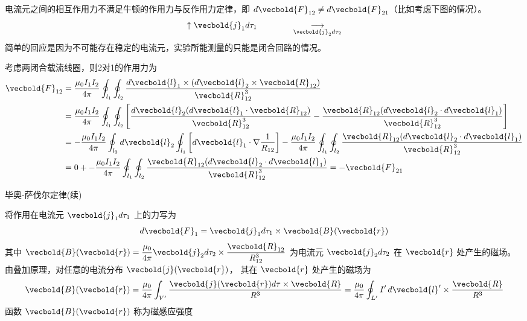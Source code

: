 \begin{example}
    电流元之间的相互作用力不满足牛顿的作用力与反作用力定律，即 \( d\vecbold{F}_{12} \neq d\vecbold{F}_{21} \)（比如考虑下图的情况）。
\[
\uparrow \vecbold{j}_1 d\tau_1
\qquad\qquad
\underset{\vecbold{j}_2 d\tau_2}{\longrightarrow}
\]
简单的回应是因为不可能存在稳定的电流元，实验所能测量的只能是闭合回路的情况。
\begin{explain}
    考虑两闭合载流线圈，则2对1的作用力为
\begin{align*}
    \vecbold{F}_{12} &= \frac{\mu_0 I_1 I_2}{4\pi} 
    \oint_{l_1} \oint_{l_2} \frac{d\vecbold{l}_1 
    \times (d\vecbold{l}_2 \times \vecbold{R}_{12})}{\vecbold{R}_{12}^3}\\
    &= \frac{\mu_0 I_1 I_2}{4\pi} 
    \oint_{l_1} \oint_{l_2} \left[ \frac{d\vecbold{l}_2 (d\vecbold{l}_1 
    \cdot \vecbold{R}_{12})}{\vecbold{R}_{12}^3} 
    - \frac{\vecbold{R}_{12} (d\vecbold{l}_2 \cdot d\vecbold{l}_1)}
    {\vecbold{R}_{12}^3} \right]\\
    &= -\frac{\mu_0 I_1 I_2}{4\pi} \oint_{l_2} d\vecbold{l}_2 
    \oint_{l_1} \left[ d\vecbold{l}_1 \cdot \nabla \frac{1}{R_{12}} \right] 
    - \frac{\mu_0 I_1 I_2}{4\pi} \oint_{l_1} \oint_{l_2} 
    \frac{\vecbold{R}_{12} (d\vecbold{l}_2 \cdot d\vecbold{l}_1)}
    {\vecbold{R}_{12}^3} \\
    &= 0 + -\frac{\mu_0 I_1 I_2}{4\pi} \oint_{l_1} 
    \oint_{l_2} \frac{\vecbold{R}_{12} (d\vecbold{l}_2 \cdot d\vecbold{l}_1)}
    {\vecbold{R}_{12}^3} 
    = -\vecbold{F}_{21}
\end{align*}
\end{explain}
\end{example}
\begin{law}
    毕奥-萨伐尔定律(续)
    
    将作用在电流元 \( \vecbold{j}_1 d\tau_1 \) 上的力写为
\[
d\vecbold{F}_1 = \vecbold{j}_1 d\tau_1 \times \vecbold{B}(\vecbold{r})
\]
其中 \(\displaystyle \vecbold{B}(\vecbold{r}) = \frac{\mu_0}{4\pi} \vecbold{j}_2 d\tau_2 
\times \frac{\vecbold{R}_{12}}{R_{12}^3}\) 为电流元 \( \vecbold{j}_2 d\tau_2 \) 
在 \(\vecbold{r}\) 处产生的磁场。由叠加原理，对任意的电流分布 \(\vecbold{j}(\vecbold{r})\)，
其在 \(\vecbold{r}\) 处产生的磁场为
\[
\vecbold{B}(\vecbold{r}) = \frac{\mu_0}{4\pi} 
\int_{V'} \frac{\vecbold{j}(\vecbold{r}) d\tau \times \vecbold{R}}{R^3}
=\frac{\mu_0}{4\pi} 
\oint_{L'} I' \, d\vecbold{l}'\times \frac{\vecbold{R}}{R^3}
\]
函数 \(\vecbold{B}(\vecbold{r})\) 称为磁感应强度
\end{law}

